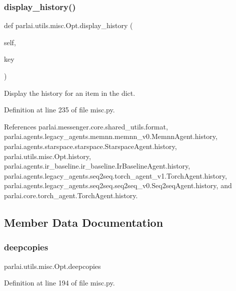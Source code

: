 \subsubsection{\texorpdfstring{display\+\_\+history()}{display\_history()}}
{\footnotesize\ttfamily def parlai.\+utils.\+misc.\+Opt.\+display\+\_\+history (\begin{DoxyParamCaption}\item[{}]{self,  }\item[{}]{key }\end{DoxyParamCaption})}

\begin{DoxyVerb}Display the history for an item in the dict.\end{DoxyVerb}
 

Definition at line 235 of file misc.\+py.



References parlai.\+messenger.\+core.\+shared\+\_\+utils.\+format, parlai.\+agents.\+legacy\+\_\+agents.\+memnn.\+memnn\+\_\+v0.\+Memnn\+Agent.\+history, parlai.\+agents.\+starspace.\+starspace.\+Starspace\+Agent.\+history, parlai.\+utils.\+misc.\+Opt.\+history, parlai.\+agents.\+ir\+\_\+baseline.\+ir\+\_\+baseline.\+Ir\+Baseline\+Agent.\+history, parlai.\+agents.\+legacy\+\_\+agents.\+seq2seq.\+torch\+\_\+agent\+\_\+v1.\+Torch\+Agent.\+history, parlai.\+agents.\+legacy\+\_\+agents.\+seq2seq.\+seq2seq\+\_\+v0.\+Seq2seq\+Agent.\+history, and parlai.\+core.\+torch\+\_\+agent.\+Torch\+Agent.\+history.



\subsection{Member Data Documentation}
\mbox{\label{classparlai_1_1utils_1_1misc_1_1Opt_a2bf9d8a08183cd0f988b7a116ae9b396}} 
\subsubsection{\texorpdfstring{deepcopies}{deepcopies}}
{\footnotesize\ttfamily parlai.\+utils.\+misc.\+Opt.\+deepcopies}



Definition at line 194 of file misc.\+py.



